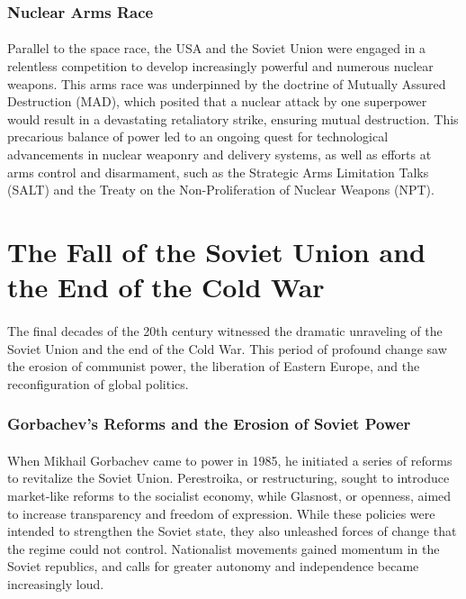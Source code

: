 \documentclass[a4paper,12pt]{book}
\begin{document}
\subsubsection*{Nuclear Arms Race}
\paragraph{}
Parallel to the space race, the USA and the Soviet Union were engaged in a relentless competition to develop increasingly powerful and numerous nuclear weapons. This arms race was underpinned by the doctrine of Mutually Assured Destruction (MAD), which posited that a nuclear attack by one superpower would result in a devastating retaliatory strike, ensuring mutual destruction. This precarious balance of power led to an ongoing quest for technological advancements in nuclear weaponry and delivery systems, as well as efforts at arms control and disarmament, such as the Strategic Arms Limitation Talks (SALT) and the Treaty on the Non-Proliferation of Nuclear Weapons (NPT). 

\section*{The Fall of the Soviet Union and the End of the Cold War}
\paragraph{}
The final decades of the 20th century witnessed the dramatic unraveling of the Soviet Union and the end of the Cold War. This period of profound change saw the erosion of communist power, the liberation of Eastern Europe, and the reconfiguration of global politics. 

\subsubsection*{Gorbachev’s Reforms and the Erosion of Soviet Power}
\paragraph{}
When Mikhail Gorbachev came to power in 1985, he initiated a series of reforms to revitalize the Soviet Union. Perestroika, or restructuring, sought to introduce market-like reforms to the socialist economy, while Glasnost, or openness, aimed to increase transparency and freedom of expression. While these policies were intended to strengthen the Soviet state, they also unleashed forces of change that the regime could not control. Nationalist movements gained momentum in the Soviet republics, and calls for greater autonomy and independence became increasingly loud. 
\end{document}
